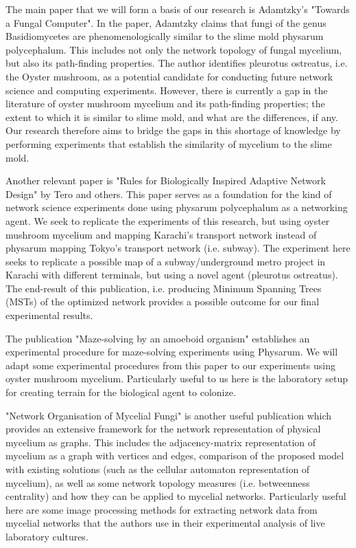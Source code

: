 The main paper that we will form a basis of our research is Adamtzky's "Towards a Fungal Computer". \cite{fungalcomp} In the paper, Adamtzky claims that fungi of the genus Basidiomycetes are phenomenologically similar to the slime mold physarum polycephalum. This includes not only the network topology of fungal mycelium, but also its path-finding properties. The author identifies pleurotus ostreatus, i.e. the Oyster mushroom, as a potential candidate for conducting future network science and computing experiments. However, there is currently a gap in the literature of oyster mushroom mycelium and its path-finding properties; the extent to which it is similar to slime mold, and what are the differences, if any. Our research therefore aims to bridge the gaps in this shortage of knowledge by performing experiments that establish the similarity of mycelium to the slime mold.

Another relevant paper is "Rules for Biologically Inspired Adaptive Network Design" \cite{rulesBioDesign} by Tero and others. This paper serves as a foundation for the kind of network science experiments done using physarum polycephalum as a networking agent. We seek to replicate the experiments of this research, but using oyster mushroom mycelium and mapping Karachi's transport network instead of physarum mapping Tokyo's transport network (i.e. subway). The experiment here seeks to replicate a possible map of a subway/underground metro project in Karachi with different terminals, but using a novel agent (pleurotus ostreatus). The end-result of this publication, i.e. producing Minimum Spanning Trees (MSTs) of the optimized network provides a possible outcome for our final experimental results.

The publication "Maze-solving by an
amoeboid organism" \cite{mazesolving} establishes an experimental procedure for maze-solving experiments using Physarum. We will adapt some experimental procedures from this paper to our experiments using oyster mushroom mycelium. Particularly useful to us here is the laboratory setup for creating terrain for the biological agent to colonize.

"Network Organisation of Mycelial Fungi" \cite{networkmyc} is another useful publication which provides an extensive framework for the network representation of physical mycelium as graphs. This includes the adjacency-matrix representation of mycelium as a graph with vertices and edges, comparison of the proposed model with existing solutions (such as the cellular automaton representation of mycelium), as well as some network topology measures (i.e. betweenness centrality) and how they can be applied to mycelial networks. Particularly useful here are some image processing methods for extracting network data from mycelial networks that the authors use in their experimental analysis of live laboratory cultures.

